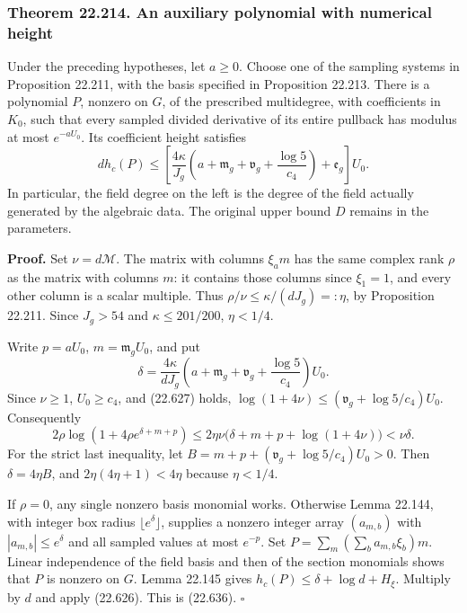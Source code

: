 \documentclass[
  11pt,
  a4paper,
]{article}
\begin{document}
\subsubsection{Theorem 22.214. An auxiliary polynomial with numerical
height}\label{theorem-22.214.-an-auxiliary-polynomial-with-numerical-height}

Under the preceding hypotheses, let \(a\ge0\). Choose one of the
sampling systems in Proposition 22.211, with the basis specified in
Proposition 22.213. There is a polynomial \(P\), nonzero on \(G\), of
the prescribed multidegree, with coefficients in \(K_0\), such that
every sampled divided derivative of its entire pullback has modulus at
most \(e^{-aU_0}\). Its coefficient height satisfies \[
 d h_c(P)\le\left[
 \frac{4\kappa}{J_g}
       \left(a+\mathfrak m_g+\mathfrak v_g+
                         \frac{\log5}{c_4}\right)
       +\mathfrak e_g\right]U_0.
 \tag{22.636}
\] In particular, the field degree on the left is the degree of the
field actually generated by the algebraic data. The original upper bound
\(D\) remains in the parameters.

\textbf{Proof.} Set \(\nu=d\mathcal M\). The matrix with columns
\(\xi_a m\) has the same complex rank \(\rho\) as the matrix with
columns \(m\): it contains those columns since \(\xi_1=1\), and every
other column is a scalar multiple. Thus
\(\rho/\nu\le\kappa/(dJ_g)=:\eta\), by Proposition 22.211. Since
\(J_g>54\) and \(\kappa\le201/200\), \(\eta<1/4\).

Write \(p=aU_0\), \(m=\mathfrak m_gU_0\), and put \[
 \delta=\frac{4\kappa}{dJ_g}
          \left(a+\mathfrak m_g+\mathfrak v_g+
                                \frac{\log5}{c_4}\right)U_0.
 \tag{22.637}
\] Since \(\nu\ge1\), \(U_0\ge c_4\), and (22.627) holds,
\(\log(1+4\nu)\le(\mathfrak v_g+\log5/c_4)U_0\). Consequently \[
 2\rho\log(1+4\rho e^{\delta+m+p})
 \le2\eta\nu\bigl(\delta+m+p+\log(1+4\nu)\bigr)
 <\nu\delta.
 \tag{22.638}
\] For the strict last inequality, let
\(B=m+p+(\mathfrak v_g+\log5/c_4)U_0>0\). Then \(\delta=4\eta B\), and
\(2\eta(4\eta+1)<4\eta\) because \(\eta<1/4\).

If \(\rho=0\), any single nonzero basis monomial works. Otherwise Lemma
22.144, with integer box radius \(\lfloor e^\delta\rfloor\), supplies a
nonzero integer array \((a_{m,b})\) with \(|a_{m,b}|\le e^\delta\) and
all sampled values at most \(e^{-p}\). Set
\(P=\sum_m(\sum_b a_{m,b}\xi_b)m\). Linear independence of the field
basis and then of the section monomials shows that \(P\) is nonzero on
\(G\). Lemma 22.145 gives \(h_c(P)\le\delta+\log d+H_\xi\). Multiply by
\(d\) and apply (22.626). This is (22.636). \(\square\)
\end{document}
